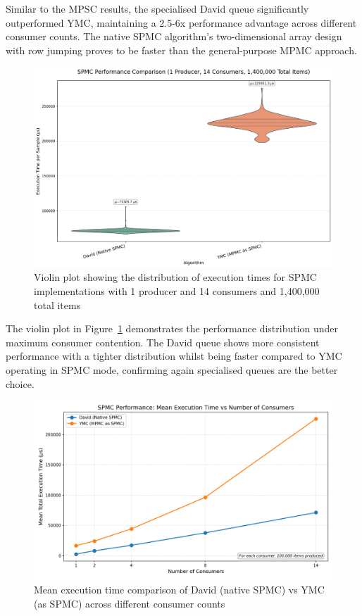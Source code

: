 Similar to the \ac{MPSC} results, the specialised David queue significantly outperformed \ac{YMC}, maintaining a 2.5-6x performance advantage across different consumer counts. The native \ac{SPMC} algorithm's two-dimensional array design with row jumping proves to be faster than the general-purpose \ac{MPMC} approach.

\begin{figure}[htb]
\centering
\caption{Violin plot showing the distribution of execution times for \ac{SPMC} implementations with 1 producer and 14 consumers and 1,400,000 total items}
\label{fig:spmc-violin-14c}
\includegraphics[width=\textwidth]{images/results/best_in_spmc_performance_violin_1P14C.png}
\end{figure}

The violin plot in Figure~\ref{fig:spmc-violin-14c} demonstrates the performance distribution under maximum consumer contention. The David queue shows more consistent performance with a tighter distribution whilst being faster compared to \ac{YMC} operating in SPMC mode, confirming again specialised queues are the better choice.

\begin{figure}[htb]
\centering
\caption{Mean execution time comparison of David (native SPMC) vs YMC (as SPMC) across different consumer counts}
\label{fig:cross-spmc-mean}
\includegraphics[width=\textwidth]{images/results/best_in_spmc_mean_performance_vs_consumers.png}
\end{figure}

